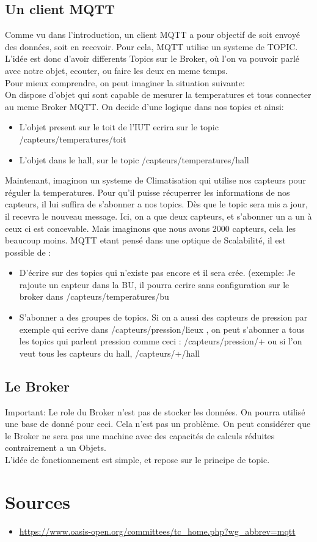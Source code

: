 \documentclass[a4paper,10pt]{article}
\begin{document}
\subsection{Un client MQTT}
 Comme vu dans l'introduction, un client MQTT a pour objectif de soit envoyé des données, soit en recevoir. Pour cela, MQTT utilise un systeme de TOPIC. L'idée est donc d'avoir differents Topics sur le Broker, où l'on va pouvoir parlé avec notre objet, ecouter, ou faire les deux en meme temps.\\
 Pour mieux comprendre, on peut imaginer la situation suivante:\\
 On dispose d'objet qui sont capable de mesurer la temperatures et tous connecter au meme Broker MQTT.
 On decide d'une logique dans nos topics et ainsi:
 \begin{itemize}
  \item L'objet present sur le toit de l'IUT ecrira sur le topic /capteurs/temperatures/toit
  \item L'objet dans le hall, sur le topic /capteurs/temperatures/hall
 \end{itemize}
Maintenant, imaginon un systeme de Climatisation qui utilise nos capteurs pour réguler la temperatures. Pour qu'il puisse récuperrer les informations de nos capteurs, il lui suffira de s'abonner a nos topics. Dès que le topic sera mis a jour, il recevra le nouveau message.
Ici, on a que deux capteurs, et s'abonner un a un à ceux ci est concevable. Mais imaginons que nous avons 2000 capteurs, cela les beaucoup moins. MQTT etant pensé dans une optique de Scalabilité, il est possible de :
\begin{itemize}
 \item D'écrire sur des topics qui n'existe pas encore et il sera crée. (exemple: Je rajoute un capteur dans la BU, il pourra ecrire sans configuration sur le broker dans /capteurs/temperatures/bu
 \item S'abonner a des groupes de topics. Si on a aussi des capteurs de pression par exemple qui ecrive dans /capteurs/pression/lieux , on peut s'abonner a tous les topics qui parlent pression comme ceci : /capteurs/pression/+ ou si l'on veut tous les capteurs du hall, /capteurs/+/hall
 
\end{itemize}






\subsection{Le Broker}
Important: Le role du Broker n'est pas de stocker les données. On pourra utilisé une base de donné pour ceci. Cela n'est pas un problème. On peut considérer que le Broker ne sera pas une machine avec des capacités de calculs réduites contrairement a un Objets.\\
L'idée de fonctionnement est simple, et repose sur le principe de topic.  





 \section{Sources}

\begin{itemize}
 \item \url{https://www.oasis-open.org/committees/tc_home.php?wg_abbrev=mqtt}
\end{itemize}
\end{document}
